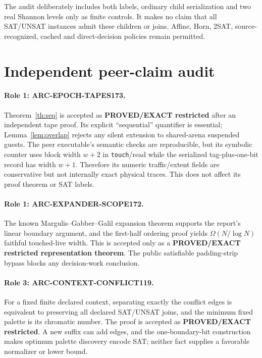 \documentclass[11pt]{article}
\begin{document}
The audit deliberately includes both labels, ordinary child serialization and
two real Shannon levels only as finite controls.  It makes no claim that all
SAT/UNSAT instances admit these children or joins.  Affine, Horn, 2SAT,
source-recognized, cached and direct-decision policies remain permitted.

\section{Independent peer-claim audit}
\paragraph{Role 1: ARC-EPOCH-TAPES173.}
Theorem~\ref{th:seq} is accepted as \textbf{PROVED/EXACT restricted} after an
independent tape proof.  Its explicit ``sequential'' quantifier is essential;
Lemma~\ref{lem:overlap} rejects any silent extension to shared-arena suspended
guests.  The peer executable's semantic checks are reproducible, but its
symbolic counter uses block width $w+2$ in \texttt{touch}/read while the
serialized tag-plus-one-bit record has width $w+1$.  Therefore its numeric
traffic/extent fields are conservative but not internally exact physical
traces.  This does not affect its proof theorem or SAT labels.

\paragraph{Role 1: ARC-EXPANDER-SCOPE172.}
The known Margulis--Gabber--Galil expansion theorem supports the report's
linear boundary argument, and the first-half ordering proof yields
$\Omega(N/\log N)$ faithful touched-live width.  This is accepted only as a
\textbf{PROVED/EXACT restricted representation theorem}.  The public
satisfiable padding-strip bypass blocks any decision-work conclusion.

\paragraph{Role 3: ARC-CONTEXT-CONFLICT119.}
For a fixed finite declared context, separating exactly the conflict edges is
equivalent to preserving all declared SAT/UNSAT joins, and the minimum fixed
palette is its chromatic number.  The proof is accepted as
\textbf{PROVED/EXACT restricted}.  A new suffix can add edges, and the
one-boundary-bit construction makes optimum palette discovery encode SAT;
neither fact supplies a favorable normalizer or lower bound.
\end{document}
